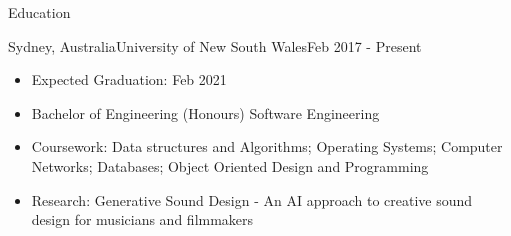 \documentclass[]{mcdowellcv}
\begin{document}
	\makeheader
	
	\begin{cvsection}{Education}
		\begin{cvsubsection}{Sydney, Australia}{University of New South Wales}{Feb 2017 - Present}
			\begin{itemize}
				\item Expected Graduation: Feb 2021
				\item Bachelor of Engineering (Honours) Software Engineering
				\item Coursework: Data structures and Algorithms; Operating Systems; Computer Networks; Databases; Object Oriented Design and Programming
				\item Research: Generative Sound Design - An AI approach to creative sound design for musicians and filmmakers
			\end{itemize}
		\end{cvsubsection}
	\end{cvsection}
	
\end{document}
